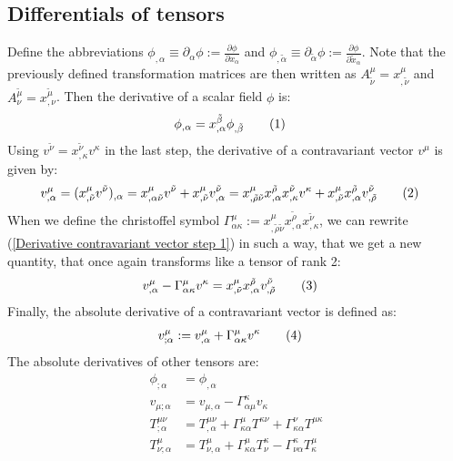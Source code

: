 \documentclass[a4paper,12pt]{article}
\newcommand\numberthis{\addtocounter{equation}{1}\tag{\theequation}}
\begin{document}
\subsection{Differentials of tensors}
Define the abbreviations $\phi_{,\alpha}\equiv\partial_\alpha\phi:=\frac{\partial\phi}{\partial x_\alpha}$ and $\phi_{,\tilde{\alpha}}\equiv\partial_{\tilde{\alpha}}\phi:=\frac{\partial\phi}{\partial \tilde{x}_\alpha}$. Note that the previously defined transformation matrices are then written as $A^\mu_{\tilde{\nu}}=x^\mu_{,\tilde{\nu}}$ and $A^{\tilde{\mu}}_\nu=x^{\tilde{\mu}}_{,\nu}$. Then the derivative of a scalar field $\phi$ is:
\begin{align*}
\phi_{,\alpha}&=x^{\tilde{\beta}}_{,\alpha}\phi_{,\tilde{\beta}}\numberthis\label{Derivative scalar field}
\end{align*}
Using $v^{\tilde{\nu}}=x^{\tilde{\nu}}_{,\kappa}v^\kappa$ in the last step, the derivative of a contravariant vector $v^\mu$ is given by:
\begin{align*}
v^\mu_{,\alpha}&=(x^\mu_{,\tilde{\nu}}v^{\tilde{\nu}})_{,\alpha}=x^\mu_{,\alpha\tilde{\nu}}v^{\tilde{\nu}}+x^\mu_{,\tilde{\nu}}v^{\tilde{\nu}}_{,\alpha}=x^\mu_{,\tilde{\rho}\tilde{\nu}}x^{\tilde{\rho}}_{,\alpha}x^{\tilde{\nu}}_{,\kappa}v^\kappa+x^\mu_{,\tilde{\nu}}x^{\tilde{\rho}}_{,\alpha}v^{\tilde{\nu}}_{,\tilde{\rho}}\numberthis\label{Derivative contravariant vector step 1}
\end{align*}
When we define the christoffel symbol $\Gamma^\mu_{\alpha\kappa}:=x^\mu_{,\tilde{\rho}\tilde{\nu}}x^{\tilde{\rho}}_{,\alpha}x^{\tilde{\nu}}_{,\kappa}$, we can rewrite (\ref{Derivative contravariant vector step 1}) in such a way, that we get a new quantity, that once again transforms like a tensor of rank 2:
\begin{align*}
v^\mu_{,\alpha}-\Gamma^\mu_{\alpha\kappa}v^\kappa&=x^\mu_{,\tilde{\nu}}x^{\tilde{\rho}}_{,\alpha}v^{\tilde{\nu}}_{,\tilde{\rho}}\numberthis\label{Derivative contravariant vector step 2}
\end{align*}
Finally, the absolute derivative of a contravariant vector is defined as:
\begin{align*}
v^\mu_{;\alpha}&:=v^\mu_{,\alpha}+\Gamma^\mu_{\alpha\kappa}v^\kappa\numberthis\label{Absolute derivative of contravariant vector}
\end{align*}
The absolute derivatives of other tensors are:
\begin{align*}
\phi_{;\alpha}&=\phi_{,\alpha}\\
v_{\mu ;\alpha}&=v_{\mu ,\alpha}-\Gamma^\kappa_{\alpha\mu}v_\kappa\\
T^{\mu\nu}_{;\alpha}&=T^{\mu\nu}_{,\alpha}+\Gamma^\mu_{\kappa\alpha} T^{\kappa\nu}+\Gamma^\nu_{\kappa\alpha}T^{\mu\kappa}\\
T^\mu_{\nu ;\alpha}&=T^\mu_{\nu ,\alpha}+\Gamma^\mu_{\kappa\alpha}T^\kappa_\nu -\Gamma^\kappa_{\nu\alpha}T^\mu_\kappa
\end{align*}
\end{document}
